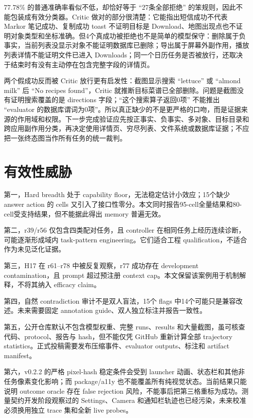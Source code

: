 \documentclass[12pt,a4paper]{ctexart}
\begin{document}
77.78\% 的普通准确率看似不低，却恰好等于 ``27条全部拒绝'' 的笨规则，因此不能包装成有效分类器。Critic 做对的部分很清楚：它能指出短信成功不代表 Markor 笔记成功、复制成功 toast 不证明目标是 Download、地图出现点也不证明对象类型和坐标准确。但4个真成功被拒绝也不是简单的模型保守：删除属于负事实，当前列表没显示对象不能证明数据库已删除；导出属于屏幕外副作用，播放列表详情不能证明文件已进入 Downloads；同一个日历任务是否被放行，还取决于结束时有没有主动停在包含完整字段的详情页。

两个假成功反而被 Critic 放行更有启发性：截图显示搜索 ``lettuce'' 或 ``almond milk'' 后 ``No recipes found''，Critic 就推断目标菜谱已全部删除。问题是截图没有证明搜索覆盖的是 directions 字段；``这个搜索算子返回0项'' 不能推出 ``evaluator 的数据库谓词为0项''。所以真正缺少的不是更严格的口吻，而是证据来源的作用域和权限。下一步完成验证应先按正事实、负事实、多对象、目标目录和跨应用副作用分类，再决定使用详情页、穷尽列表、文件系统或数据库证据；不应把一张终态图当作所有任务的统一裁判。

\section{有效性威胁}

第一，Hard breadth 处于 capability floor，无法稳定估计小效应；15个缺少 answer action 的 cells 又引入了接口性零分。本文同时报告95-cell全量结果和80-cell受支持结果，但不能据此得出 memory 普遍无效。

第二，r39/r56 仅包含四类配对任务，且 controller 在相同任务上经历连续诊断，可能逐渐形成域内 task-pattern engineering。它们适合工程 qualification，不适合作为未见泛化证据。

第三，H17 在 r61--r78 中被反复观察，r77 成功存在 development contamination，且 prompt 超过预注册 context cap。本文保留该案例用于机制解释，不将其纳入 efficacy claim。

第四，自然 contradiction 审计不是双人盲法，15个 flags 中14个可能只是兼容改述。未来需要固定 annotation guide、双人独立标注并报告一致性。

第五，公开仓库默认不包含模型权重、完整 runs、results 和大量截图，虽可核查代码、protocol、报告与 hash，但不能仅凭 GitHub 重新计算全部 trajectory statistics。正式投稿需要发布压缩事件、evaluator outputs、标注和 artifact manifest。

第六，v0.2.2 的严格 pixel-hash 稳定条件会受到 launcher 动画、状态栏和其他非任务像素变化影响；而 package/a11y 也不能覆盖所有纯视觉状态。当前结果只能说明 outcome oracle 存在 false rejection 风险，不能事后把第三格重标为成功。测量契约开发阶段观察过的 Settings、Camera 和通知栏轨迹也已经污染，未来校准必须换用独立 trace 集和全新 live probes。
\end{document}
